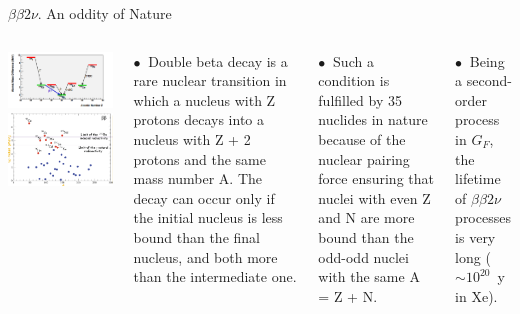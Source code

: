\documentclass [aspectratio=169]{beamer}
\begin{document}
\begin{frame}{$\beta\beta2\nu$. An oddity of Nature}

\begin{columns}
\includegraphics[scale=0.40]{xebb2nu.png}
\includegraphics[scale=0.40]{betabetaisotopes.png}


$\bullet~$ Double beta decay is a rare nuclear transition in which a nucleus with Z protons decays into a nucleus with Z + 2 protons and the same mass number A. The decay can occur only if the initial nucleus is less bound than the final nucleus, and both more than the intermediate one.

$\bullet~$ Such a condition is fulfilled by 35 nuclides in nature because of the nuclear pairing force ensuring that nuclei with even Z and N are more bound than the odd-odd nuclei with the same A = Z + N.

$\bullet~$ Being a second-order process in $G_F$, the lifetime of $\beta\beta2\nu$ processes is very long ($\sim 10^{20}$~y in Xe).
 
\end{columns}
\end{frame}
\end{document}
